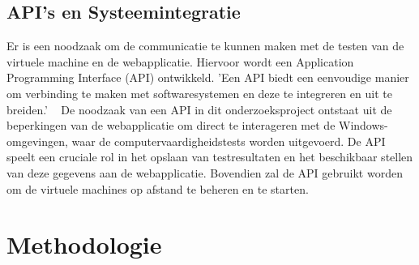 \subsection{API's en Systeemintegratie}
Er is een noodzaak om de communicatie te kunnen maken met de testen van de virtuele machine en de webapplicatie. Hiervoor wordt een Application Programming Interface (API) ontwikkeld. 'Een API biedt een eenvoudige manier om verbinding te maken met softwaresystemen en deze te integreren en uit te breiden.' ~\autocite{biehl2015api} De noodzaak van een API in dit onderzoeksproject ontstaat uit de beperkingen van de webapplicatie om direct te interageren met de Windows-omgevingen, waar de computervaardigheidstests worden uitgevoerd. De API speelt een cruciale rol in het opslaan van testresultaten en het beschikbaar stellen van deze gegevens aan de webapplicatie. Bovendien zal de API gebruikt worden om de virtuele machines op afstand te beheren en te starten.


\section{Methodologie}%
\label{sec:methodologie}





